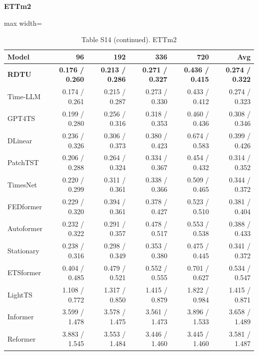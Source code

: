 \begin{table}[H]\centering\small
\caption*{Table S14 (continued). ETTm2}
\textbf{ETTm2}\par\smallskip
\begin{adjustbox}{max width=\linewidth}\begin{tabular}{lrrrrr}\toprule
\textbf{Model} & \textbf{96} & \textbf{192} & \textbf{336} & \textbf{720} & \textbf{Avg}\\\midrule
\rowcolor{blue!5}
\textbf{RDTU} & \textbf{0.176 / 0.260} & \textbf{0.213 / 0.286} & \textbf{0.271 / 0.327} & \textbf{0.436 / 0.415} & \textbf{0.274 / 0.322}\\
Time-LLM & 0.174 / 0.261 & 0.215 / 0.287 & 0.273 / 0.330 & 0.433 / 0.412 & 0.274 / 0.323\\
GPT4TS & 0.199 / 0.280 & 0.256 / 0.316 & 0.318 / 0.353 & 0.460 / 0.436 & 0.308 / 0.346\\
DLinear & 0.236 / 0.326 & 0.306 / 0.373 & 0.380 / 0.423 & 0.674 / 0.583 & 0.399 / 0.426\\
PatchTST & 0.206 / 0.288 & 0.264 / 0.324 & 0.334 / 0.367 & 0.454 / 0.432 & 0.314 / 0.352\\
TimesNet & 0.220 / 0.299 & 0.311 / 0.361 & 0.338 / 0.366 & 0.509 / 0.465 & 0.344 / 0.372\\
FEDformer & 0.229 / 0.320 & 0.394 / 0.361 & 0.378 / 0.427 & 0.523 / 0.510 & 0.381 / 0.404\\
Autoformer & 0.232 / 0.322 & 0.291 / 0.357 & 0.478 / 0.517 & 0.553 / 0.538 & 0.388 / 0.433\\
Stationary & 0.238 / 0.316 & 0.298 / 0.349 & 0.353 / 0.380 & 0.475 / 0.445 & 0.341 / 0.372\\
ETSformer & 0.404 / 0.485 & 0.479 / 0.521 & 0.552 / 0.555 & 0.701 / 0.627 & 0.534 / 0.547\\
LightTS & 1.108 / 0.772 & 1.317 / 0.850 & 1.415 / 0.879 & 1.822 / 0.984 & 1.415 / 0.871\\
Informer & 3.599 / 1.478 & 3.578 / 1.475 & 3.561 / 1.473 & 3.896 / 1.533 & 3.658 / 1.489\\
Reformer & 3.883 / 1.545 & 3.553 / 1.484 & 3.446 / 1.460 & 3.445 / 1.460 & 3.581 / 1.487\\
\bottomrule\end{tabular}\end{adjustbox}\end{table}
